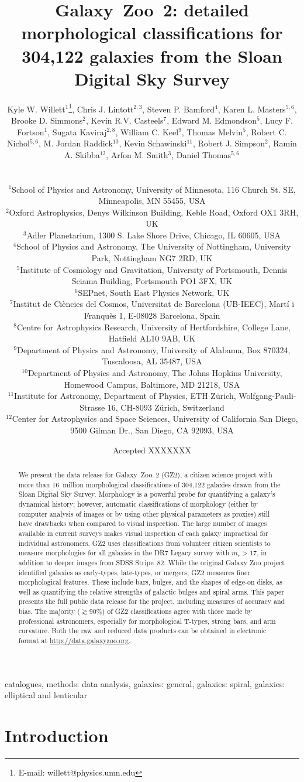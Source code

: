 \documentclass[useAMS,usenatbib]{mn2e}
\title[Galaxy Zoo 2 data release]{Galaxy~Zoo~2: detailed morphological classifications for 304,122 galaxies from the Sloan Digital Sky Survey}
\author[Willett et al.]{
  \parbox[t]{16cm}{
  Kyle W. Willett$^{1}$\thanks{E-mail: willett@physics.umn.edu},
  Chris J. Lintott$^{2,3}$,
  Steven P. Bamford$^{4}$,
  Karen L. Masters$^{5,6}$,
  Brooke D. Simmons$^{2}$,
  Kevin R.V. Casteels$^{7}$,
  Edward M. Edmondson$^{5}$,
  Lucy F. Fortson$^{1}$,
  Sugata Kaviraj$^{2,8}$,
  William C. Keel$^{9}$,
  Thomas Melvin$^{5}$,
  Robert C. Nichol$^{5,6}$,
  M. Jordan Raddick$^{10}$,
  Kevin Schawinski$^{11}$,
  Robert J. Simpson$^{2}$,
  Ramin A. Skibba$^{12}$,
  Arfon M. Smith$^{3}$,
  Daniel Thomas$^{5,6}$
  \\
  }\\
$^{1}$School of Physics and Astronomy, University of Minnesota, 116 Church St. SE, Minneapolis, MN 55455, USA \\
$^{2}$Oxford Astrophysics, Denys Wilkinson Building, Keble Road, Oxford OX1 3RH, UK \\
$^{3}$Adler Planetarium, 1300 S. Lake Shore Drive, Chicago, IL 60605, USA \\
$^{4}$School of Physics and Astronomy, The University of Nottingham, University Park, Nottingham NG7 2RD, UK \\
$^{5}$Institute of Cosmology and Gravitation, University of Portsmouth, Dennis Sciama Building, Portsmouth PO1 3FX, UK \\
$^{6}$SEPnet, South East Physics Network, UK \\
$^{7}$Institut de Ci\`encies del Cosmos, Universitat de Barcelona (UB-IEEC), Mart\'i i Franqu\`es 1, E-08028 Barcelona, Spain \\
$^{8}$Centre for Astrophysics Research, University of Hertfordshire, College Lane, Hatfield AL10 9AB, UK \\
$^{9}$Department of Physics and Astronomy, University of Alabama, Box 870324, Tuscaloosa, AL 35487, USA \\
$^{10}$Department of Physics and Astronomy, The Johns Hopkins University, Homewood Campus, Baltimore, MD 21218, USA \\
$^{11}$Institute for Astronomy, Department of Physics, ETH Z\"urich, Wolfgang-Pauli-Strasse 16, CH-8093 Z\"urich, Switzerland \\
$^{12}$Center for Astrophysics and Space Sciences, University of California San Diego, 9500 Gilman Dr., San Diego, CA 92093, USA \\
}
\begin{document}
\date{Accepted XXXXXXX}

\pagerange{\pageref{firstpage}--\pageref{lastpage}} 

\maketitle

\label{firstpage}

\begin{abstract}
We present the data release for Galaxy~Zoo~2 (GZ2), a citizen science project with more than 16~million morphological classifications of 304,122 galaxies drawn from the Sloan Digital Sky Survey. Morphology is a powerful probe for quantifying a galaxy's dynamical history; however, automatic classifications of morphology (either by computer analysis of images or by using other physical parameters as proxies) still have drawbacks when compared to visual inspection. The large number of images available in current surveys makes visual inspection of each galaxy impractical for individual astronomers. GZ2 uses classifications from volunteer citizen scientists to measure morphologies for all galaxies in the DR7 Legacy survey with $m_r>17$, in addition to deeper images from SDSS Stripe~82. While the original Galaxy Zoo project identified galaxies as early-types, late-types, or mergers, GZ2 measures finer morphological features. These include bars, bulges, and the shapes of edge-on disks, as well as quantifying the relative strengths of galactic bulges and spiral arms. This paper presents the full public data release for the project, including measures of accuracy and bias. The majority ($\gtrsim90\%$) of GZ2 classifications agree with those made by professional astronomers, especially for morphological T-types, strong bars, and arm curvature. Both the raw and reduced data products can be obtained in electronic format at \url{http://data.galaxyzoo.org}.
\end{abstract}

\begin{keywords}
catalogues, methods: data analysis, galaxies: general, galaxies: spiral, galaxies: elliptical and lenticular
\end{keywords}


\section{Introduction} \label{sec-intro}
\end{document}
